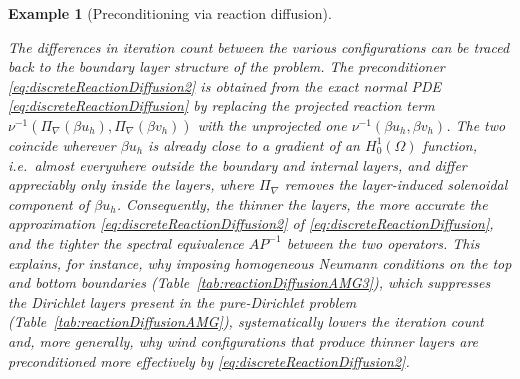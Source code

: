 \documentclass[hidelinks,onefignum,onetabnum]{siamart220329}
\newcommand{\bb}[1]{#1}
\newtheorem{example}{Example}
\begin{document}
\begin{example}[Preconditioning via reaction diffusion]
\begin{remark}\label{rmk:boundaryLayers}
    \bb{The differences in iteration count between the various configurations can be traced back to the boundary layer structure of the problem. The preconditioner \eqref{eq:discreteReactionDiffusion2} is obtained from the exact normal PDE \eqref{eq:discreteReactionDiffusion} by replacing the projected reaction term $\nu^{-1}(\Pi_{\nabla}(\beta u_h),\Pi_{\nabla}(\beta v_h))$ with the unprojected one $\nu^{-1}(\beta u_h,\beta v_h)$. The two coincide wherever $\beta u_h$ is already close to a gradient of an $H^1_0(\Omega)$ function, i.e.~almost everywhere \emph{outside} the boundary and internal layers, and differ appreciably only \emph{inside} the layers, where $\Pi_{\nabla}$ removes the layer-induced solenoidal component of $\beta u_h$. Consequently, the thinner the layers, the more accurate the approximation \eqref{eq:discreteReactionDiffusion2} of \eqref{eq:discreteReactionDiffusion}, and the tighter the spectral equivalence $AP^{-1}$ between the two operators. This explains, for instance, why imposing homogeneous Neumann conditions on the top and bottom boundaries (Table~\ref{tab:reactionDiffusionAMG3}), which suppresses the Dirichlet layers present in the pure-Dirichlet problem (Table~\ref{tab:reactionDiffusionAMG}), systematically lowers the iteration count and, more generally, why wind configurations that produce thinner layers are preconditioned more effectively by \eqref{eq:discreteReactionDiffusion2}.}
\end{remark}


\end{example}
\end{document}
